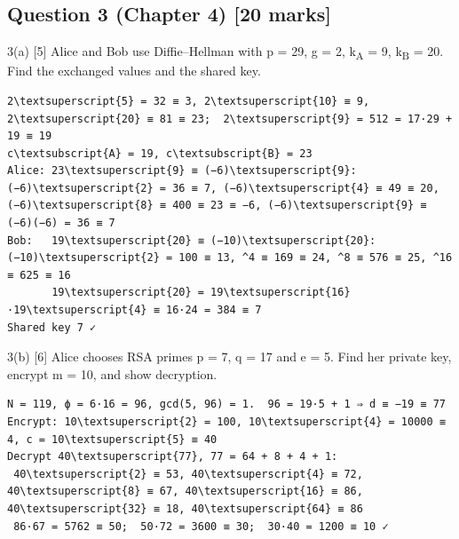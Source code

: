 \documentclass[11pt,a4paper]{article}
\begin{document}
\subsection*{Question 3 (Chapter 4) [20 marks]}
\begin{question}{3(a) \hfill\textnormal{\small [5]}}
Alice and Bob use Diffie–Hellman with p = 29, g = 2, k\textsubscript{A} = 9, k\textsubscript{B} = 20. Find the exchanged values and the shared key.\par
\end{question}
\begin{answer}
\begin{workbox}
\begin{Verbatim}[commandchars=\\\{\},fontsize=\tiny]
2\textsuperscript{5} = 32 ≡ 3, 2\textsuperscript{10} ≡ 9, 2\textsuperscript{20} ≡ 81 ≡ 23;  2\textsuperscript{9} = 512 = 17·29 + 19 ≡ 19
c\textsubscript{A} = 19, c\textsubscript{B} = 23
Alice: 23\textsuperscript{9} ≡ (−6)\textsuperscript{9}: (−6)\textsuperscript{2} = 36 ≡ 7, (−6)\textsuperscript{4} ≡ 49 ≡ 20, (−6)\textsuperscript{8} ≡ 400 ≡ 23 ≡ −6, (−6)\textsuperscript{9} ≡ (−6)(−6) = 36 ≡ 7
Bob:   19\textsuperscript{20} ≡ (−10)\textsuperscript{20}: (−10)\textsuperscript{2} = 100 ≡ 13, ^4 ≡ 169 ≡ 24, ^8 ≡ 576 ≡ 25, ^16 ≡ 625 ≡ 16
       19\textsuperscript{20} = 19\textsuperscript{16}·19\textsuperscript{4} ≡ 16·24 = 384 ≡ 7
Shared key 7 ✓
\end{Verbatim}
\end{workbox}
\end{answer}
\begin{question}{3(b) \hfill\textnormal{\small [6]}}
Alice chooses RSA primes p = 7, q = 17 and e = 5. Find her private key, encrypt m = 10, and show decryption.\par
\end{question}
\begin{answer}
\begin{workbox}
\begin{Verbatim}[commandchars=\\\{\},fontsize=\footnotesize]
N = 119, ϕ = 6·16 = 96, gcd(5, 96) = 1.  96 = 19·5 + 1 ⇒ d ≡ −19 ≡ 77
Encrypt: 10\textsuperscript{2} = 100, 10\textsuperscript{4} = 10000 ≡ 4, c = 10\textsuperscript{5} ≡ 40
Decrypt 40\textsuperscript{77}, 77 = 64 + 8 + 4 + 1:
 40\textsuperscript{2} ≡ 53, 40\textsuperscript{4} ≡ 72, 40\textsuperscript{8} ≡ 67, 40\textsuperscript{16} ≡ 86, 40\textsuperscript{32} ≡ 18, 40\textsuperscript{64} ≡ 86
 86·67 = 5762 ≡ 50;  50·72 = 3600 ≡ 30;  30·40 = 1200 ≡ 10 ✓
\end{Verbatim}
\end{workbox}
\end{answer}
\end{document}

